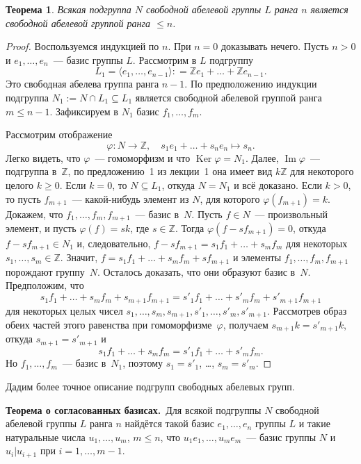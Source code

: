 \documentclass[a4paper,10pt]{amsart}
\newcommand{\Ker}{\mathop{\mathrm{Ker}}}
\renewcommand{\Im}{\mathop{\mathrm{Im}}}
\def\ZZ{{\mathbb Z}}%
\newtheorem{theorem}{Теорема}
\theoremstyle{definition}
\theoremstyle{remark}
\begin{document}
\begin{theorem}
Всякая подгруппа $N$ свободной абелевой группы $L$ ранга $n$
является свободной абелевой группой ранга $\leqslant n$.
\end{theorem}

\begin{proof}
Воспользуемся индукцией по $n$. При $n=0$ доказывать нечего. Пусть
$n>0$ и $e_1,\ldots,e_n$~--- базис группы $L$. Рассмотрим в $L$
подгруппу
$$
L_1 = \langle e_1,\ldots,e_{n-1}\rangle : = \ZZ e_1 + \ldots + \ZZ
e_{n-1}.
$$
Это свободная абелева группа ранга $n-1$. По предположению индукции
подгруппа $N_1:=N\cap L_1 \subseteq L_1$ является свободной абелевой
группой ранга $m \leqslant n-1$. Зафиксируем в $N_1$ базис $f_1,
\ldots, f_m$.

Рассмотрим отображение
$$
\varphi \colon N \to \ZZ, \quad s_1e_1 + \ldots + s_ne_n \mapsto
s_n.
$$
Легко видеть, что $\varphi$~--- гомоморфизм и что $\Ker \varphi =
N_1$. Далее, $\Im \varphi$~--- подгруппа в~$\ZZ$, по предложению~1
из лекции~1 она имеет вид $k \ZZ$ для некоторого целого $k \geqslant
0$. Если $k=0$, то $N \subseteq L_1$, откуда $N = N_1$ и всё
доказано. Если $k>0$, то пусть $f_{m+1}$~--- какой-нибудь элемент из
$N$, для которого $\varphi(f_{m+1}) = k$. Докажем, что $f_1, \ldots,
f_m, f_{m+1}$~--- базис в~$N$. Пусть $f \in N$~--- произвольный
элемент, и пусть $\varphi(f) = sk$, где $s \in \ZZ$. Тогда
$\varphi(f - sf_{m+1}) = 0$, откуда $f - sf_{m+1} \in N_1$ и,
следовательно, $f - sf_{m+1} = s_1 f_1 + \ldots + s_m f_m$ для
некоторых $s_1, \ldots, s_m \in \ZZ$. Значит, $f = s_1 f_1 + \ldots
+ s_m f_m + s f_{m+1}$ и элементы $f_1, \ldots, f_m, f_{m+1}$
порождают группу~$N$. Осталось доказать, что они образуют базис
в~$N$. Предположим, что
$$
s_1 f_1 + \ldots + s_m f_m + s_{m+1} f_{m+1} = s'_1 f_1 + \ldots +
s'_m f_m + s'_{m+1} f_{m+1}
$$
для некоторых целых чисел $s_1, \ldots, s_m, s_{m+1}, s'_1, \ldots,
s'_m, s'_{m+1}$. Рассмотрев образ обеих частей этого равенства при
гомоморфизме~$\varphi$, получаем $s_{m+1} k = s'_{m+1} k$, откуда
$s_{m+1} = s'_{m+1}$ и
$$
s_1 f_1 + \ldots + s_m f_m = s'_1 f_1 + \ldots + s'_m f_m.
$$
Но $f_1, \ldots, f_m$~--- базис в~$N_1$, поэтому $s_1 = s'_1$,
\ldots, $s_m = s'_m$.
\end{proof}

Дадим более точное описание подгрупп свободных абелевых групп.

\smallskip

{\bf Теорема о согласованных базисах.}\ Для всякой подгруппы $N$
свободной абелевой группы $L$ ранга $n$ найдётся такой базис $e_1,
\ldots, e_n$ группы $L$ и такие натуральные числа $u_1, \ldots,
u_m$, $m \leqslant n$, что $u_1 e_1, \ldots, u_m e_m$~--- базис
группы $N$ и $u_i | u_{i+1}$ при $i = 1, \ldots, m-1$.
\end{document}
